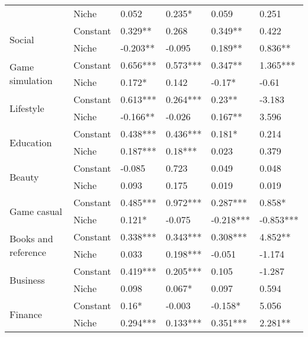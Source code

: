 \begin{longtable}[h!]{llllll}
          & Niche &               0.052 &      0.235* &      0.059 &      0.251 \\
\cline{1-6}
\multirow{2}{*}{Social} & Constant &             0.329** &       0.268 &    0.349** &      0.422 \\
          & Niche &            -0.203** &      -0.095 &    0.189** &    0.836** \\
\cline{1-6}
\multirow{2}{*}{Game simulation} & Constant &            0.656*** &    0.573*** &    0.347** &   1.365*** \\
          & Niche &              0.172* &       0.142 &     -0.17* &      -0.61 \\
\cline{1-6}
\multirow{2}{*}{Lifestyle} & Constant &            0.613*** &    0.264*** &     0.23** &     -3.183 \\
          & Niche &            -0.166** &      -0.026 &    0.167** &      3.596 \\
\cline{1-6}
\multirow{2}{*}{Education} & Constant &            0.438*** &    0.436*** &     0.181* &      0.214 \\
          & Niche &            0.187*** &     0.18*** &      0.023 &      0.379 \\
\cline{1-6}
\multirow{2}{*}{Beauty} & Constant &              -0.085 &       0.723 &      0.049 &      0.048 \\
          & Niche &               0.093 &       0.175 &      0.019 &      0.019 \\
\cline{1-6}
\multirow{2}{*}{Game casual} & Constant &            0.485*** &    0.972*** &   0.287*** &     0.858* \\
          & Niche &              0.121* &      -0.075 &  -0.218*** &  -0.853*** \\
\cline{1-6}
\multirow{2}{*}{Books and reference} & Constant &            0.338*** &    0.343*** &   0.308*** &    4.852** \\
          & Niche &               0.033 &    0.198*** &     -0.051 &     -1.174 \\
\cline{1-6}
\multirow{2}{*}{Business} & Constant &            0.419*** &    0.205*** &      0.105 &     -1.287 \\
          & Niche &               0.098 &      0.067* &      0.097 &      0.594 \\
\cline{1-6}
\multirow{2}{*}{Finance} & Constant &               0.16* &      -0.003 &    -0.158* &      5.056 \\
          & Niche &            0.294*** &    0.133*** &   0.351*** &    2.281** \\

\end{longtable}
